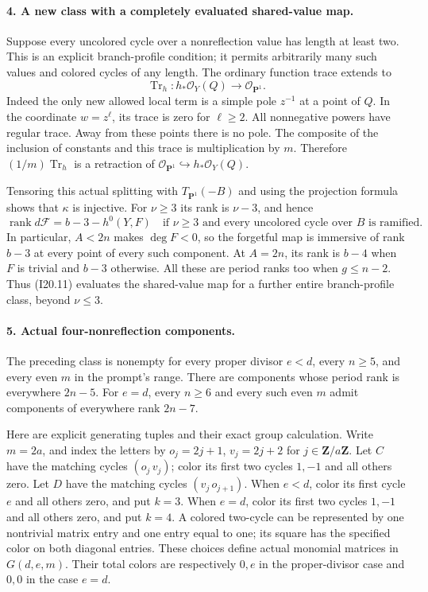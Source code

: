 \paragraph{4. A new class with a completely evaluated shared-value map.}
Suppose every uncolored cycle over a nonreflection value has
length at least two. This is an explicit branch-profile
condition; it permits arbitrarily many such values and colored
cycles of any length. The ordinary function trace extends to
\[
           \operatorname{Tr}_h:h_*\mathcal O_Y(Q)
                                      \longrightarrow\mathcal O_{\mathbf P^1}.
\]
Indeed the only new allowed local term is a simple pole
$z^{-1}$ at a point of $Q$. In the coordinate $w=z^\ell$,
its trace is zero for $\ell\geq2$. All nonnegative powers
have regular trace. Away from these points there is no pole.
The composite of the inclusion of constants and this trace
is multiplication by $m$. Therefore $(1/m)\operatorname{Tr}_h$
is a retraction of
$\mathcal O_{\mathbf P^1}\hookrightarrow h_*\mathcal O_Y(Q)$.

Tensoring this actual splitting with $T_{\mathbf P^1}(-B)$
and using the projection formula shows that $\kappa$ is
injective. For $\nu\geq3$ its rank is $\nu-3$, and hence
\begin{equation}
 \boxed{\operatorname{rank}d\mathcal F=b-3-h^0(Y,F)
 \quad\text{if }\nu\geq3\text{ and every uncolored cycle over }B
                       \text{ is ramified}.}          \tag{I20.11}
\end{equation}
In particular, $A<2n$ makes $\deg F<0$, so the forgetful
map is immersive of rank $b-3$ at every point of every such
component. At $A=2n$, its rank is $b-4$ when $F$ is trivial
and $b-3$ otherwise. All these are period ranks too when
$g\leq n-2$. Thus (I20.11) evaluates the shared-value map
for a further entire branch-profile class, beyond $\nu\leq3$.

\paragraph{5. Actual four-nonreflection components.}
The preceding class is nonempty for every proper divisor
$e<d$, every $n\geq5$, and every even $m$ in the prompt's
range. There are components whose period rank is everywhere
$2n-5$. For $e=d$, every $n\geq6$ and every such even $m$
admit components of everywhere rank $2n-7$.

Here are explicit generating tuples and their exact group
calculation. Write $m=2a$, and index the letters by
$o_j=2j+1$, $v_j=2j+2$ for $j\in\mathbf Z/a\mathbf Z$.
Let $C$ have the matching cycles $(o_j\,v_j)$; color its
first two cycles $1,-1$ and all others zero. Let $D$ have
the matching cycles $(v_j\,o_{j+1})$. When $e<d$, color its
first cycle $e$ and all others zero, and put $k=3$.
When $e=d$, color its first two cycles $1,-1$ and all others
zero, and put $k=4$. A colored two-cycle can be represented
by one nontrivial matrix entry and one entry equal to one;
its square has the specified color on both diagonal entries.
These choices define actual monomial matrices in $G(d,e,m)$.
Their total colors are respectively $0,e$ in the proper-divisor
case and $0,0$ in the case $e=d$.

